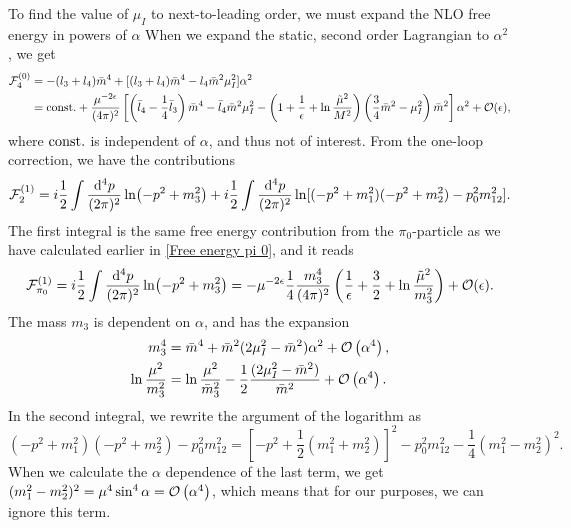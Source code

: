 To find the value of $\mu_I$ to next-to-leading order, we must expand the NLO free energy in powers of $\alpha$
When we expand the static, second order Lagrangian to $\alpha^2$, we get
\begin{align}
    \nonumber
    \Ef_4^{(0)}
    &= - (l_3 + l_4)\bar m^4 + [(l_3 + l_4)\bar m^4 -l_4 \bar m^2\mu_I^2]\alpha^2
    \\
    & =
    \const + 
    \frac{\mu^{-2\epsilon}}{(4\pi)^2}
    \left[
        \left(
            \bar l_4 - \frac{1}{4}\bar l_3
        \right)\bar m^4
        -\bar l_4\bar m^2\mu_I^2
        -\left(
            1 + \frac{1}{\epsilon} + \ln\frac{\tilde \mu^2}{M^2}
        \right)
        \left(\frac{3}{4}\bar m^2 - \mu_I^2\right)\bar m^2
    \right]\alpha^2 + \mathcal{O}(\epsilon),
\end{align}
where $\const$ is independent of $\alpha$, and thus not of interest.
From the one-loop correction, we have the contributions
\begin{equation}
    \Ef_2^{(1)} = i \frac{1}{2}\int \frac{\dd^4 p}{(2\pi)^2} \ln(-p^2 + m_3^2)
    +  i \frac{1}{2} \int \frac{\dd^4 p}{(2\pi)^2} \ln[(-p^2 + m_1^2)(-p^2 + m_2^2) - p_0^2 m_{12}^2].
\end{equation}
The first integral is the same free energy contribution from the $\pi_0$-particle as we have calculated earlier in \cref{Free energy pi 0}, and it reads
\begin{equation}
    \Ef_{\pi_0}^{(1)}
    = i \frac{1}{2}\int \frac{\dd^4 p}{(2\pi)^2} \ln(-p^2 + m_3^2)
    = - \mu^{-2\epsilon}\frac{1}{4} \frac{m_3^4}{(4 \pi)^2}
    \left(\frac{1}{\epsilon} + \frac{3}{2} + \ln \frac{\tilde \mu^2}{m_3^2}\right) + \mathcal{O}(\epsilon).
\end{equation}
The mass $m_3$ is dependent on $\alpha$, and has the expansion
\begin{align*}
    m_3^4
    &= \bar m^4 + \bar m^2(2\mu_I^2 - \bar m^2)\alpha^2+ \Oh[4]{\alpha}, \\
    \ln \frac{\mu^2}{m_3^2}
    &=
    \ln \frac{\mu^2}{\bar m_3^2} - \frac{1}{2} \frac{(2\mu_I^2 - \bar m^2)}{\bar m^2}+ \Oh[4]{\alpha}.
\end{align*}
In the second integral, we rewrite the argument of the logarithm as
\begin{equation}
    (-p^2 + m_1^2)(-p^2 + m_2^2) - p_0^2 m_{12}^2
    =  \left[-p^2 + \frac{1}{2}(m_1^2 + m_2^2)\right]^2 - p_0^2 m_{12}^2 - \frac{1}{4}(m_1^2 - m_2^2)^2.
\end{equation}
When we calculate the $\alpha$ dependence of the last term, we get  $(m_1^2 - m_2^2)^2 = \mu^4 \sin^4\alpha = \Oh[4]{\alpha}$, which means that for our purposes, we can ignore this term.
